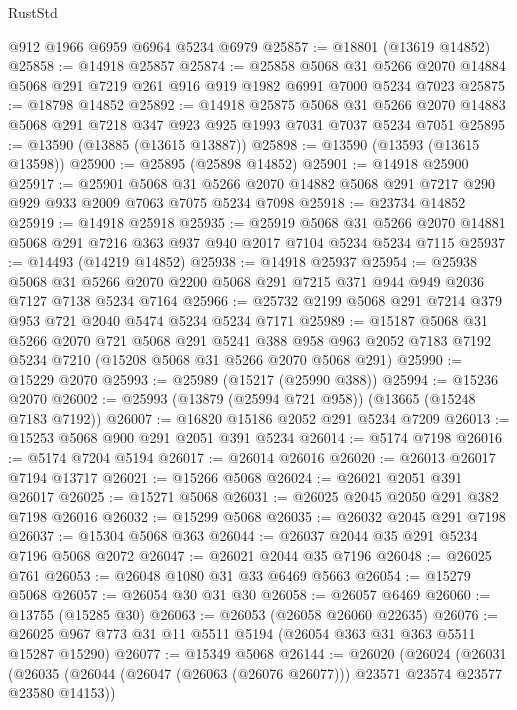 \begin{lexlean}{RustStd}
\begin{coremodule}
    @912
    @1966
    @6959
    @6964
    @5234
    @6979
@25857 := @18801 (@13619 @14852)
@25858 := @14918 @25857
@25874 := @25858
    @5068
    @31
    @5266
    @2070
    @14884
    @5068
    @291
    @7219
    @261
    @916
    @919
    @1982
    @6991
    @7000
    @5234
    @7023
@25875 := @18798 @14852
@25892 := @14918
    @25875
    @5068
    @31
    @5266
    @2070
    @14883
    @5068
    @291
    @7218
    @347
    @923
    @925
    @1993
    @7031
    @7037
    @5234
    @7051
@25895 := @13590 (@13885 (@13615 @13887))
@25898 := @13590 (@13593 (@13615 @13598))
@25900 := @25895 (@25898 @14852)
@25901 := @14918 @25900
@25917 := @25901
    @5068
    @31
    @5266
    @2070
    @14882
    @5068
    @291
    @7217
    @290
    @929
    @933
    @2009
    @7063
    @7075
    @5234
    @7098
@25918 := @23734 @14852
@25919 := @14918 @25918
@25935 := @25919
    @5068
    @31
    @5266
    @2070
    @14881
    @5068
    @291
    @7216
    @363
    @937
    @940
    @2017
    @7104
    @5234
    @5234
    @7115
@25937 := @14493 (@14219 @14852)
@25938 := @14918 @25937
@25954 := @25938
    @5068
    @31
    @5266
    @2070
    @2200
    @5068
    @291
    @7215
    @371
    @944
    @949
    @2036
    @7127
    @7138
    @5234
    @7164
@25966 := @25732 @2199 @5068 @291 @7214 @379 @953 @721 @2040 @5474 @5234 @5234 @7171
@25989 := @15187
    @5068
    @31
    @5266
    @2070
    @721
    @5068
    @291
    @5241
    @388
    @958
    @963
    @2052
    @7183
    @7192
    @5234
    @7210
    (@15208 @5068 @31 @5266 @2070 @5068 @291)
@25990 := @15229 @2070
@25993 := @25989 (@15217 (@25990 @388))
@25994 := @15236 @2070
@26002 := @25993 (@13879 (@25994 @721 @958)) (@13665 (@15248 @7183 @7192))
@26007 := @16820 @15186 @2052 @291 @5234 @7209
@26013 := @15253 @5068 @900 @291 @2051 @391 @5234
@26014 := @5174 @7198
@26016 := @5174 @7204 @5194
@26017 := @26014 @26016
@26020 := @26013 @26017 @7194 @13717
@26021 := @15266 @5068
@26024 := @26021 @2051 @391 @26017
@26025 := @15271 @5068
@26031 := @26025 @2045 @2050 @291 @382 @7198 @26016
@26032 := @15299 @5068
@26035 := @26032 @2045 @291 @7198
@26037 := @15304 @5068 @363
@26044 := @26037 @2044 @35 @291 @5234 @7196 @5068 @2072
@26047 := @26021 @2044 @35 @7196
@26048 := @26025 @761
@26053 := @26048 @1080 @31 @33 @6469 @5663
@26054 := @15279 @5068
@26057 := @26054 @30 @31 @30
@26058 := @26057 @6469
@26060 := @13755 (@15285 @30)
@26063 := @26053 (@26058 @26060 @22635)
@26076 := @26025 @967 @773 @31 @11 @5511 @5194 (@26054 @363 @31 @363 @5511 @15287 @15290)
@26077 := @15349 @5068
@26144 := @26020
    (@26024
      (@26031
        (@26035 (@26044 (@26047 (@26063 (@26076 @26077))) @23571 @23574 @23577 @23580 @14153))

\end{coremodule}
\end{lexlean}
